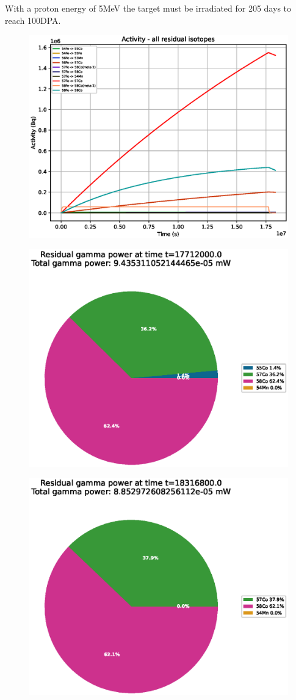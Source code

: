 With a proton energy of 5MeV the target must be irradiated for 205 days to reach 100DPA.

\begin{figure}[!htb]
\centering
\includegraphics[width=0.7\linewidth]{chapters/activity_code/fe_100dpa/by_isotope/05MeV_all_radioactive_isotopes.eps}
\caption{}
\label{fig:5mev-proton-100dpa-activity}
\end{figure}

\begin{figure}[!htb]
\centering
\includegraphics[width=0.7\linewidth]{chapters/activity_code/fe_100dpa/endofbeam/05MeV_0400_17712000.eps}
\caption{}
\label{fig:5mev-proton-100dpa}
\end{figure}

\begin{figure}[!htb]
\centering
\includegraphics[width=0.7\linewidth]{chapters/activity_code/fe_100dpa/endofbeam/05MeV_0500_18316800.eps}
\caption{}
\label{fig:5mev-proton-100dpa}
\end{figure}


